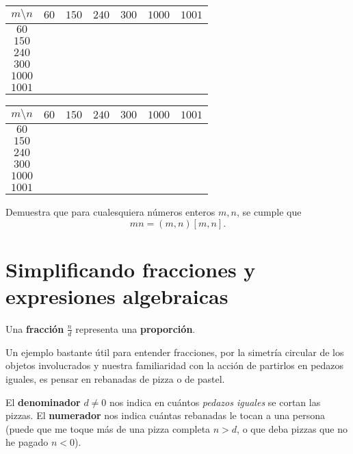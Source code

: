 \begin{tabular}{|c||c|c|c|c|c|c|} 
 \hline
  $m\setminus n$& $60$ & $150$ & $240$ & $300$ & $1000$ & $1001$ \\ 
  \hline
  \hline
  $60$&  &  &  &  &  &  \\
  \hline
  $150$&  &  &  &  &  &  \\ 
  \hline
  $240$&  &  &  &  &  &  \\ 
  \hline
  $300$&  &  &  &  &  &  \\ 
  \hline
  $1000$&  &  &  &  &  &  \\
  \hline
  $1001$&  &  &  &  &  &  \\ 
  \hline
  \end{tabular}    
  \hspace{1cm}
  \begin{tabular}{|c||c|c|c|c|c|c|} 
 \hline
  $m\setminus n$& $60$ & $150$ & $240$ & $300$ & $1000$ & $1001$ \\ 
  \hline
  \hline
  $60$&  &  &  &  &  &  \\ 
  \hline
  $150$&  &  &  &  &  &  \\ 
  \hline
  $240$&  &  &  &  &  &  \\ 
  \hline
  $300$&  &  &  &  &  &  \\ 
  \hline
  $1000$&  &  &  &  &  &  \\
  \hline
  $1001$&  &  &  &  &  &  \\ 
  \hline
  \end{tabular}    

\begin{ejercicio}
Demuestra que para cualesquiera números enteros $m,n$, se cumple que $$mn=(m,n)[m,n].$$
\end{ejercicio}

\section{Simplificando fracciones y expresiones algebraicas}

Una {\bf fracción} $\frac{n}{d}$ representa una {\bf proporción}. 

Un ejemplo bastante útil para entender fracciones, por la simetría circular de los objetos involucrados y nuestra familiaridad con la acción de partirlos en pedazos iguales, es pensar en rebanadas de pizza o de pastel. 

El {\bf denominador} $d\neq 0$ nos indica en cuántos \emph{pedazos iguales} se cortan las pizzas. El {\bf numerador} nos indica cuántas rebanadas le tocan a una persona (puede que me toque más de una pizza completa $n>d$, o que deba pizzas que no he pagado $n<0$).


